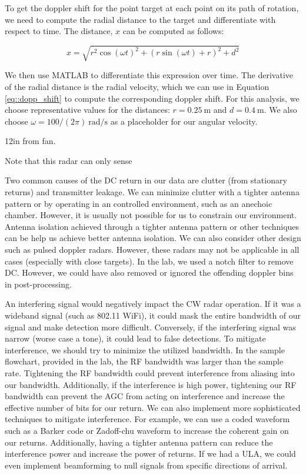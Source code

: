\documentclass{article}
\begin{document}
\noindent To get the doppler shift for the point target at each point on its path of rotation, we need to compute the radial distance to the target and differentiate with respect to time. The distance, $x$ can be computed as follows:

\begin{equation*}
	x = \sqrt{r^2\cos({\omega}t)^2 + (r\sin({\omega}t) + r)^2 + d^2}
\end{equation*}

\noindent We then use MATLAB to differentiate this expression over time. The derivative of the radial distance is the radial velocity, which we can use in Equation \ref{eq::dopp_shift} to compute the corresponding doppler shift. For this analysis, we choose representative values for the distances: $r = 0.25\ \text{m}$ and $d = 0.4\ \text{m}$. We also choose $\omega = 100/(2\pi)\ \text{rad}/\text{s}$ as a placeholder for our angular velocity.
 
 12in from fan.

Note that this radar can only sense 

Two common causes of the DC return in our data are clutter (from stationary returns) and transmitter leakage. We can minimize clutter with a tighter antenna pattern or by operating in an controlled environment, such as an anechoic chamber. However, it is usually not possible for us to constrain our environment. Antenna isolation achieved through a tighter antenna pattern or other techniques can be help us achieve better antenna isolation. We can also consider other design such as pulsed doppler radars. However, these radars may not be applicable in all cases (especially with close targets). In the lab, we used a notch filter to remove DC. However, we could have also removed or ignored the offending doppler bins in post-processing.

An interfering signal would negatively impact the CW radar operation. If it was a wideband signal (such as 802.11 WiFi), it could mask the entire bandwidth of our signal and make detection more difficult. Conversely, if the interfering signal was narrow (worse case a tone), it could lead to false detections. To mitigate interference, we should try to minimize the utilized bandwidth. In the sample flowchart, provided in the lab, the RF bandwidth was larger than the sample rate. Tightening the RF bandwidth could prevent interference from aliasing into our bandwidth. Additionally, if the interference is high power, tightening our RF bandwidth can prevent the AGC from acting on interference and increase the effective number of bits for our return. We can also implement more sophisticated techniques to mitigate interference. For example, we can use a coded waveform such as a Barker code or Zadoff-chu waveform to increase the coherent gain on our returns. Additionally, having a tighter antenna pattern can reduce the interference power and increase the power of returns. If we had a ULA, we could even implement beamforming to null signals from specific directions of arrival.
\end{document}
